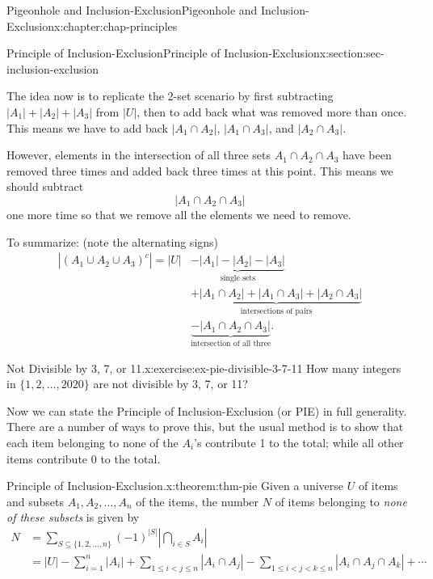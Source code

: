 \documentclass[oneside,10pt,]{book}
\numberwithin{equation}{section}
\newcommand{\lt}{<}
\newcommand{\amp}{&}
\begin{document}
\begin{chapterptx}{Pigeonhole and Inclusion-Exclusion}{}{Pigeonhole and Inclusion-Exclusion}{}{}{x:chapter:chap-principles}
\begin{sectionptx}{Principle of Inclusion-Exclusion}{}{Principle of Inclusion-Exclusion}{}{}{x:section:sec-inclusion-exclusion}
\begin{sidebyside}{1}{0.325}{0.325}{0}
\begin{sbspanel}{0.35}
{\begin{tikzpicture}
\end{tikzpicture}
}%
\end{sbspanel}%
\end{sidebyside}%
\par
The idea now is to replicate the 2-set scenario by first subtracting \(|A_1| + |A_2| + |A_3|\) from \(|U|\), then to add back what was removed more than once. This means we have to add back \(|A_1 \cap A_2|\), \(|A_1 \cap A_3|\), and \(|A_2 \cap A_3|\).%
\par
However, elements in the intersection of all three sets \(A_1 \cap A_2 \cap A_3\) have been removed three times and added back three times at this point. This means we should subtract%
\begin{equation*}
|A_1 \cap A_2 \cap A_3|
\end{equation*}
one more time so that we remove all the elements we need to remove.%
\par
To summarize: (note the alternating signs)%
\begin{align*}
|(A_1 \cup A_2 \cup A_3)^c| = |U| \amp \underbrace{- |A_1| - |A_2| - |A_3|}_{\text{single sets}} \\
\amp \underbrace{+ |A_1 \cap A_2| + |A_1 \cap A_3| + |A_2 \cap A_3|}_{\text{intersections of pairs}}\\
\amp \underbrace{- |A_1 \cap A_2 \cap A_3|}_{\text{intersection of all three}}\text{.}
\end{align*}
%
\begin{inlineexercise}{Not Divisible by 3, 7, or 11.}{x:exercise:ex-pie-divisible-3-7-11}%
How many integers in \(\{1,2,\ldots,2020\}\) are not divisible by 3, 7, or 11?%
\end{inlineexercise}
Now we can state the Principle of Inclusion-Exclusion (or PIE) in full generality. There are a number of ways to prove this, but the usual method is to show that each item belonging to none of the \(A_i\)'s contribute 1 to the total; while all other items contribute 0 to the total.%
\begin{theorem}{Principle of Inclusion-Exclusion.}{}{x:theorem:thm-pie}%
Given a universe \(U\) of items and subsets \(A_1,A_2,\ldots,A_n\) of the items, the number \(N\) of items belonging to \emph{none of these subsets} is given by%
\begin{align*}
N \amp = \sum_{S \subseteq \{1,2,\ldots,n\}} (-1)^{|S|} \left| \bigcap_{i\in S} A_i\right|\\
\amp  = |U| - \sum_{i = 1}^n |A_i| + \sum_{1 \leq i \lt j \leq n} |A_i \cap A_j| - \sum_{1 \leq i \lt j \lt k \leq n} |A_i \cap A_j \cap A_k| + \cdots 

\end{align*}
\end{theorem}
\end{sectionptx}
\end{chapterptx}
\end{document}
